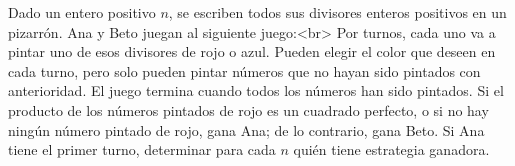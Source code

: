 Dado un entero positivo $n$, se escriben todos sus divisores enteros positivos en un pizarrón. Ana y Beto juegan al siguiente juego:<br>
Por turnos, cada uno va a pintar uno de esos divisores de rojo o azul. Pueden elegir el color que deseen en cada turno, pero solo pueden pintar números que no hayan sido pintados con anterioridad. El juego termina cuando todos los números han sido pintados. Si el producto de los números pintados de rojo es un cuadrado perfecto, o si no hay ningún número pintado de rojo, gana Ana; de lo contrario, gana Beto. Si Ana tiene el primer turno, determinar para cada $n$ quién tiene estrategia ganadora.
